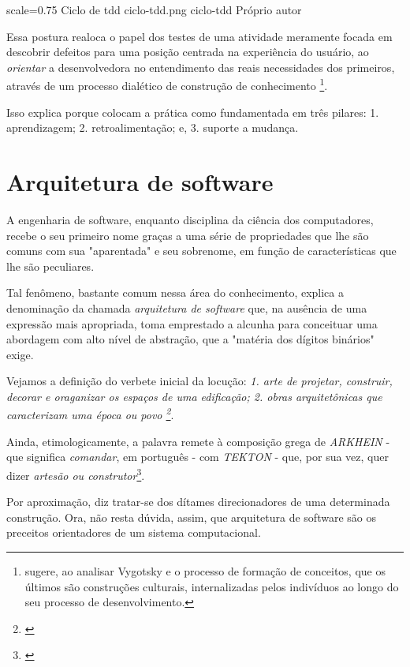     \imagem
      {scale=0.75}
      {Ciclo de tdd}
      {ciclo-tdd.png}
      {ciclo-tdd}
      {Próprio autor\footnotemark}

    Essa postura realoca o papel dos testes de uma atividade meramente focada em descobrir defeitos para uma posição centrada na experiência do usuário, ao  \emph{orientar} a desenvolvedora no entendimento das reais necessidades dos primeiros, através de um processo dialético de construção de conhecimento \footnote{ sugere, ao analisar Vygotsky e o processo de formação de conceitos, que os últimos são construções culturais, internalizadas pelos indivíduos ao longo do seu processo de desenvolvimento.}.

    Isso explica porque  colocam a prática como fundamentada em três pilares: 1. aprendizagem; 2. retroalimentação; e, 3. suporte a mudança.

\section{Arquitetura de software}

  A engenharia de software, enquanto disciplina da ciência dos computadores, recebe o seu primeiro nome graças a uma série de propriedades que lhe são comuns com sua "aparentada" e seu sobrenome, em função de características que lhe são peculiares.

  Tal fenômeno, bastante comum nessa área do conhecimento, explica a denominação da chamada \emph{arquitetura de software} que, na ausência de uma expressão mais apropriada, toma emprestado a alcunha para conceituar uma abordagem com alto nível de abstração, que a "matéria dos dígitos binários" exige.

  Vejamos a definição do verbete inicial da locução: \emph{1. arte de projetar, construir, decorar e oraganizar os espaços de uma edificação; 2. obras arquitetônicas que caracterizam uma época ou povo \footnote{\cite[p. 81]{Kury2007}}}.

  Ainda, etimologicamente, a palavra remete à composição grega de \emph{   ARKHEIN} - que significa \emph{comandar}, em português - com \emph{TEKTON} - que, por sua vez, quer dizer \emph{artesão ou construtor}\footnote{\cite{ Etimologia2019}}.

  Por aproximação, diz tratar-se dos dítames direcionadores de uma determinada construção. Ora, não resta dúvida, assim, que arquitetura de software são os preceitos orientadores de um sistema computacional.

